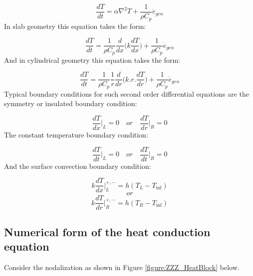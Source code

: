 \documentclass[11pt,letterpaper,titlepage]{article}
\begin{document}
\begin{equation}
\frac{dT}{dt}=\alpha \nabla^2 T + \frac{1}{\rho  C_p}\dot{e}_{gen}
\end{equation}
\newline
In slab geometry this equation takes the form:

\begin{equation}
\frac{dT}{dt}=\frac{1}{\rho  C_p} \frac{d}{dx} \biggr( k \frac{dT}{dx} \biggr) + \frac{1}{\rho  C_p}\dot{e}_{gen}
\end{equation}
\newline
And in cylindrical geometry this equation takes the form:

\begin{equation}
\frac{dT}{dt}=\frac{1}{\rho  C_p}\frac{1}{r} \frac{d}{dr} \biggr( k.r.\frac{dT}{dr} \biggr) + \frac{1}{\rho  C_p}\dot{e}_{gen}
\end{equation}
\newline
Typical boundary conditions for such second order differential equations are the symmetry or insulated boundary condition:

\begin{equation*}
\frac{dT}{dx}\biggr|_{L}=0 \quad or \quad \frac{dT}{dr}\biggr|_{R}=0
\end{equation*}
\newline
The constant temperature boundary condition:

\begin{equation*}
\frac{dT}{dt}\biggr|_{L}=0 \quad or \quad \frac{dT}{dt}\biggr|_{R}=0
\end{equation*}
\newline
And the surface convection boundary condition:

\begin{equation*}
k\frac{dT}{dx}\biggr|_L^{+,-}=h(T_L - T_{\inf})
\end{equation*}
\begin{equation*}
or
\end{equation*}
\begin{equation*}
k\frac{dT}{dr}\biggr|_R^{+,-}=h(T_R - T_{\inf})
\end{equation*}
\newline



\newpage
\subsection {Numerical form of the heat conduction equation}
Consider the nodalization as shown in Figure \ref{figure:ZZZ_HeatBlock} below.
\end{document}

